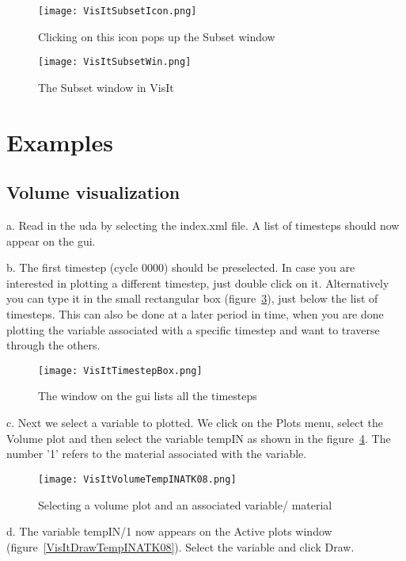 \begin{figure}
  \center
  \texttt{[image: VisItSubsetIcon.png]}
  \caption{Clicking on this icon pops up the Subset window}
  \label{VisItSubsetIcon}
\end{figure}

\begin{figure}
  \center
  \texttt{[image: VisItSubsetWin.png]}
  \caption{The Subset window in VisIt}
  \label{VisItSubsetWin}
\end{figure}

\section{Examples}

\subsection{Volume visualization}

a. Read in the uda by selecting the index.xml file. A list of timesteps should now appear on the gui.

b. The first timestep (cycle 0000) should be preselected. In case you are interested in plotting a different timestep, just double click on it. Alternatively you can type it in the small rectangular box (figure~\ref{VisItTimestepBox}), just below the list of timesteps. This can also be done at a later period in time, when you are done plotting the variable associated with a specific timestep and want to traverse through the others.

\begin{figure}
  \center
  \texttt{[image: VisItTimestepBox.png]}
  \caption{The window on the gui lists all the timesteps}
  \label{VisItTimestepBox}
\end{figure}

c. Next we select a variable to plotted. We click on the Plots menu, select the Volume plot and then select the variable tempIN as shown in the figure~\ref{VisItVolumeTempINATK08}. The number '1' refers to the material associated with the variable.

\begin{figure}
  \center
  \texttt{[image: VisItVolumeTempINATK08.png]}
  \caption{Selecting a volume plot and an associated variable/ material}
  \label{VisItVolumeTempINATK08}
\end{figure}

d. The variable tempIN/1 now appears on the Active plots window (figure~\ref{VisItDrawTempINATK08}). Select the variable and click Draw.

